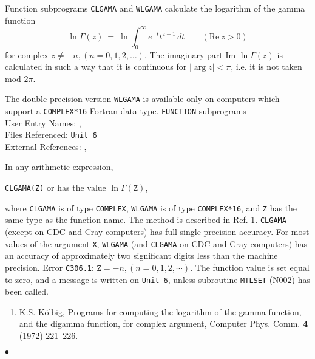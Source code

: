                     
               
\Submitter{}                         
Function subprograms {\tt CLGAMA} and {\tt WLGAMA} calculate
the logarithm of the gamma function
$$\displaystyle \ln \Gamma(z) \ = \
\ln \int_0^\infty e^{-t} t^{z-1}\, dt \qquad (\mathrm{Re}\ z>0) $$
for complex $z \neq -n, (n=0,1,2,\ldots)$. The imaginary part
Im $\ln \Gamma(z)$ is calculated in such a way that it is continuous
for $|\arg z|<\pi$, i.e. it is not taken mod $2\pi$.
\par
The double-precision version {\tt WLGAMA} is available only on computers
which support a {\tt COMPLEX*16} Fortran data type.
\Structure
{\tt FUNCTION} subprograms\\
User Entry Names: , \\
Files Referenced: {\tt Unit 6} \\
External References: , 
 
\Usage
In any arithmetic expression,
\begin{center}
{\tt CLGAMA(Z)} \quad or  \quad has the value \quad
$\ln \Gamma(\mathtt{Z})$,
\end{center}
where {\tt CLGAMA} is of type {\tt COMPLEX}, {\tt WLGAMA} is of type
{\tt COMPLEX*16}, and {\tt Z} has the same type as the function name.
\Method
The method is described in Ref. 1.
\Accuracy
{\tt CLGAMA} (except on CDC and Cray computers)
has full single-precision accuracy.
For most values of the argument {\tt X}, {\tt WLGAMA}
(and {\tt CLGAMA} on CDC and Cray computers) has an accuracy of
approximately two significant digits less than the machine precision.
\Errorh
Error {\tt C306.1}: $\mathtt{Z} = -n,(n = 0,1,2,\cdots).$
The function value is set equal to zero, and a message is written on
{\tt Unit 6}, unless subroutine {\tt MTLSET} (N002) has been called.
\Refer
\begin{enumerate}
\item K.S. K\"olbig, Programs for computing the
logarithm of the gamma function, and the digamma function, for
complex argument, Computer Phys. Comm. {\bf 4} (1972) 221--226.
\end{enumerate}
$\bullet$

